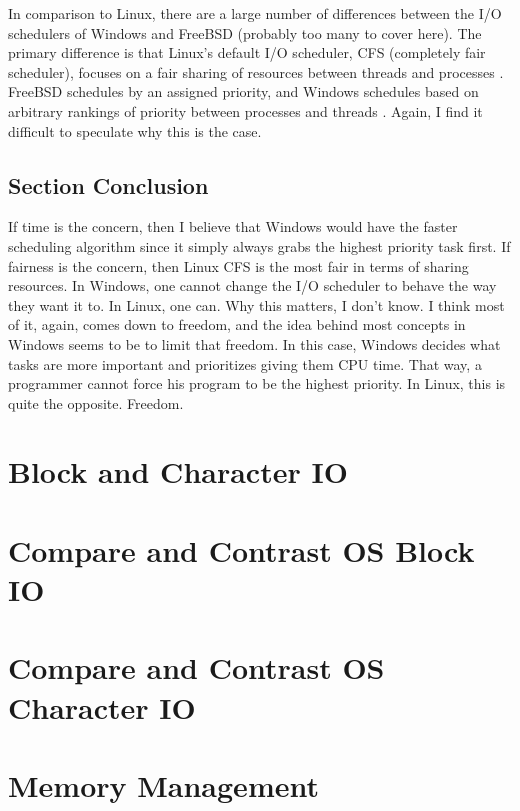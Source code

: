 \documentclass[onecolumn, draftclsnofoot,10pt, compsoc]{IEEEtran}
\begin{document}
\noindent In comparison to Linux, there are a large number of differences between the I/O schedulers of Windows and FreeBSD (probably too many to cover here). The primary difference is that Linux’s default I/O scheduler, CFS (completely fair scheduler), focuses on a fair sharing of resources between threads and processes \cite{Linux}. FreeBSD schedules by an assigned priority, and Windows schedules based on arbitrary rankings of priority between processes and threads \cite{MSWindows1PTCS} \cite{FreeBSD1PTCS}. Again, I find it difficult to speculate why this is the case. 

\subsection{Section Conclusion}
If time is the concern, then I believe that Windows would have the faster scheduling algorithm since it simply always grabs the highest priority task first. If fairness is the concern, then Linux CFS is the most fair in terms of sharing resources. In Windows, one cannot change the I/O scheduler to behave the way they want it to. In Linux, one can. Why this matters, I don’t know. I think most of it, again, comes down to freedom, and the idea behind most concepts in Windows seems to be to limit that freedom. In this case, Windows decides what tasks are more important and prioritizes giving them CPU time. That way, a programmer cannot force his program to be the highest priority. In Linux, this is quite the opposite. Freedom.\\

\section{Block and Character IO}

\section{Compare and Contrast OS Block IO}

\section{Compare and Contrast OS Character IO}

\section{Memory Management}
\end{document}
